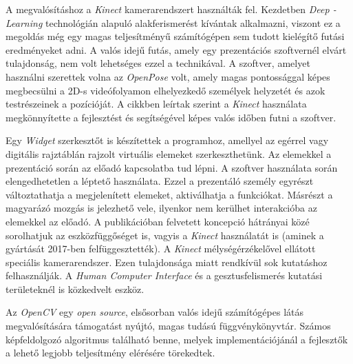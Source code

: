 A megvalósításhoz a \textit{Kinect} kamerarendszert használták fel. Kezdetben \textit{Deep\- -Learning} technológián alapuló alakferismerést kívántak alkalmazni, viszont ez a megoldás még egy magas teljesítményű számítógépen sem tudott kielégítő futási eredményeket adni. A valós idejű futás, amely egy prezentációs szoftvernél elvárt tulajdonság, nem volt lehetséges ezzel a technikával. A szoftver, amelyet használni szerettek volna az \textit{OpenPose} volt, amely magas pontossággal képes megbecsülni a 2D-s videófolyamon elhelyezkedő személyek helyzetét és azok testrészeinek a pozícióját. \cite{cao2018openpose}
A cikkben leírtak szerint a \textit{Kinect} használata megkönnyítette a fejlesztést és segítségével képes valós időben futni a szoftver.

Egy \textit{Widget} szerkesztőt is készítettek a programhoz, amellyel az egérrel vagy digitális rajztáblán rajzolt virtuális elemeket szerkeszthetünk. Az elemekkel a prezentáció során az előadó kapcsolatba tud lépni. A szoftver használata során elengedhetetlen a léptető használata. Ezzel a prezentáló személy egyrészt változtathatja a megjelenített elemeket, aktiválhatja a funkciókat. Másrészt a magyarázó mozgás is jelezhető vele, ilyenkor nem kerülhet interakcióba az elemekkel az előadó.
A publikációban felvetett koncepció hátrányai közé sorolhatjuk az eszközfüggőséget is, vagyis a \textit{Kinect} használatát is (aminek a gyártását 2017-ben felfüggesztették). A \textit{Kinect} mélységérzékelővel ellátott speciális kamerarendszer. Ezen tulajdonsága miatt rendkívül sok kutatáshoz felhasználják. A \textit{Human Computer Interface} és a gesztusfelismerés kutatási területeknél is közkedvelt eszköz. \cite{zhang2013new} \cite{tang2018structured}



Az \textit{OpenCV} egy \textit{open source}, elsősorban valós idejű számítógépes látás megvalósítására támogatást nyújtó, magas tudású függvénykönyvtár. Számos képfeldolgozó algoritmus található benne, melyek implementációjánál a fejlesztők a lehető legjobb teljesítmény elérésére törekedtek.

